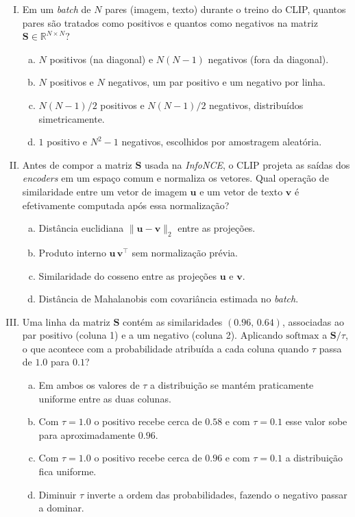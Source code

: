 \documentclass{dlproblemset}
\begin{document}
\begin{enumerate}[I)]
    \item Em um \textit{batch} de $N$ pares (imagem, texto) durante o treino do CLIP, quantos pares são tratados como positivos e quantos como negativos na matriz $\mathbf{S} \in \mathbb{R}^{N \times N}$?
    \begin{enumerate}[(a)]
        \item $N$ positivos (na diagonal) e $N(N-1)$ negativos (fora da diagonal).
        \item $N$ positivos e $N$ negativos, um par positivo e um negativo por linha.
        \item $N(N-1)/2$ positivos e $N(N-1)/2$ negativos, distribuídos simetricamente.
        \item $1$ positivo e $N^2 - 1$ negativos, escolhidos por amostragem aleatória.
    \end{enumerate}

    \item Antes de compor a matriz $\mathbf{S}$ usada na \textit{InfoNCE}, o CLIP projeta as saídas dos \textit{encoders} em um espaço comum e normaliza os vetores. Qual operação de similaridade entre um vetor de imagem $\mathbf{u}$ e um vetor de texto $\mathbf{v}$ é efetivamente computada após essa normalização?
    \begin{enumerate}[(a)]
        \item Distância euclidiana $\lVert \mathbf{u} - \mathbf{v} \rVert_2$ entre as projeções.
        \item Produto interno $\mathbf{u}\,\mathbf{v}^{\top}$ sem normalização prévia.
        \item Similaridade do cosseno entre as projeções $\mathbf{u}$ e $\mathbf{v}$.
        \item Distância de Mahalanobis com covariância estimada no \textit{batch}.
    \end{enumerate}

    \item Uma linha da matriz $\mathbf{S}$ contém as similaridades $(0.96,\, 0.64)$, associadas ao par positivo (coluna 1) e a um negativo (coluna 2). Aplicando $\mathrm{softmax}$ a $\mathbf{S}/\tau$, o que acontece com a probabilidade atribuída a cada coluna quando $\tau$ passa de $1.0$ para $0.1$?
    \begin{enumerate}[(a)]
        \item Em ambos os valores de $\tau$ a distribuição se mantém praticamente uniforme entre as duas colunas.
        \item Com $\tau = 1.0$ o positivo recebe cerca de $0.58$ e com $\tau = 0.1$ esse valor sobe para aproximadamente $0.96$.
        \item Com $\tau = 1.0$ o positivo recebe cerca de $0.96$ e com $\tau = 0.1$ a distribuição fica uniforme.
        \item Diminuir $\tau$ inverte a ordem das probabilidades, fazendo o negativo passar a dominar.
    \end{enumerate}


\end{enumerate}
\end{document}
